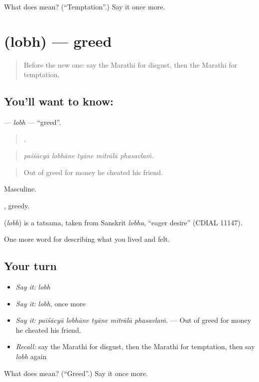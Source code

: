 \begin{tcolorbox}[breakable,colback=teal!4,colframe=teal!35!black,title={Before you move on}]
What does  mean? (\textquotedblleft{}Temptation\textquotedblright{}.) Say it once more.
\end{tcolorbox}
\section[\texorpdfstring{\mr{लोभ} (lobh)}{लोभ (lobh)}]{ (lobh) — greed}

\label{lesson:MR-C462-lobh}



\begin{quote}
Before the new one: say the Marathi for disgust, then the Marathi for temptation.
\end{quote}

\subsection*{You'll want to know: }
\textbf{} — \emph{lobh} — \textquotedblleft{}greed\textquotedblright{}.

\begin{quote}
    .
\end{quote}

\begin{quote}
\emph{paiśācyā lobhāne tyāne mitrālā phasavlaṁ.}
\end{quote}

\begin{quote}
Out of greed for money he cheated his friend.
\end{quote}

Masculine.

, greedy.

\begin{cousinweb}
\textbf{} (\emph{lobh}) is a tatsama, taken from Sanskrit \emph{lobha}, \textquotedblleft{}eager desire\textquotedblright{} (CDIAL 11147).
\end{cousinweb}

\begin{grammarlens}[title={What you've built}]
One more word for describing what you lived and felt.
\end{grammarlens}

\subsection*{Your turn}
\begin{itemize}
\raggedright
  \item \emph{Say it:} \emph{lobh}
  \item \emph{Say it:} \emph{lobh}, once more
  \item \emph{Say it:} \emph{paiśācyā lobhāne tyāne mitrālā phasavlaṁ.} — Out of greed for money he cheated his friend.
  \item \emph{Recall:} say the Marathi for disgust, then the Marathi for temptation, then say \emph{lobh} again
\end{itemize}

\begin{tcolorbox}[breakable,colback=teal!4,colframe=teal!35!black,title={Before you move on}]
What does  mean? (\textquotedblleft{}Greed\textquotedblright{}.) Say it once more.
\end{tcolorbox}
